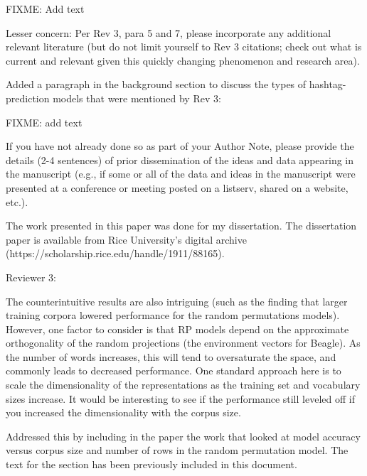 \documentclass[answers,12pt]{exam}
\begin{document}
\begin{questions}
\begin{solution}
FIXME: Add text

\end{solution}

\question Lesser concern: Per Rev 3, para 5 and 7, please incorporate any additional relevant literature (but do not limit yourself to Rev 3 citations; check out what is current and relevant given this quickly changing phenomenon and research area).

\begin{solution}
Added a paragraph in the background section to discuss the types of hashtag-prediction models that were mentioned by Rev 3:

FIXME: add text

\end{solution}

\question If you have not already done so as part of your Author Note, please provide the details (2-4 sentences) of prior dissemination of the ideas and data appearing in the manuscript (e.g., if some or all of the data and ideas in the manuscript were presented at a conference or meeting posted on a listserv, shared on a website, etc.).

\begin{solution}
The work presented in this paper was done for my dissertation.
The dissertation paper is available from Rice University's digital archive (https://scholarship.rice.edu/handle/1911/88165).
\end{solution}

Reviewer 3: 

\question The counterintuitive results are also intriguing (such as the finding that larger training corpora lowered performance for the random permutations models). However, one factor to consider is that RP models depend on the approximate orthogonality of the random projections (the environment vectors for Beagle). As the number of words increases, this will tend to oversaturate the space, and commonly leads to decreased performance. One standard approach here is to scale the dimensionality of the representations as the training set and vocabulary sizes increase. It would be interesting to see if the performance still leveled off if you increased the dimensionality with the corpus size.

\begin{solution}
Addressed this by including in the paper the work that looked at model accuracy versus corpus size and number of rows in the random permutation model.
The text for the section has been previously included in this document.
\end{solution}


\end{questions}
\end{document}
